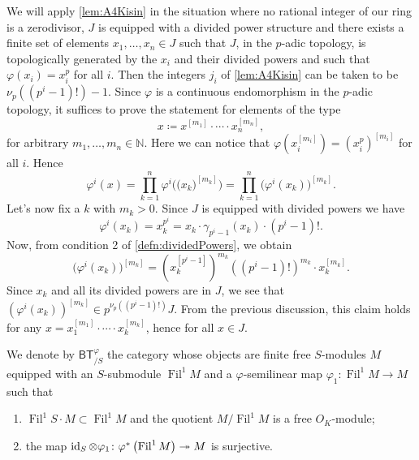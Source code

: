 \begin{rem}[]\label{rem:j_iTheoremA6}
	We will apply \cref{lem:A4Kisin} in the situation where no 
	rational integer of our ring is a zerodivisor, $J$ is equipped
	with a divided power structure and there exists a finite set of 
	elements $x_1, \ldots, x_n \in J$ such that $J$, in the $p$-adic topology, 
	is topologically generated by the $x_i$ and their divided powers
	and such that $\varphi(x_i) = x_i^p$ for all $i$.
	Then the integers $j_i$ of \cref{lem:A4Kisin} can
	be taken to be $\nu_p \left( (p^i-1)! \right) - 1$.
	Since $\varphi$ is a continuous endomorphism in the $p$-adic topology,
	it suffices to prove the statement for elements of the type
	\begin{equation*}
	x \coloneqq x^{[m_1]} \cdot \cdots \cdot x_n^{[m_n]}
	,\end{equation*}
	for arbitrary $m_1, \ldots, m_n \in \mathbb{N}$.
	Here we can notice that $\varphi(x_i^{[m_i]}) = \left( x_i^p \right)^{[m_i]}$
	for all $i$.
	Hence
	\begin{equation*}
		\varphi^i (x) = 
		\prod_{k = 1}^n \varphi^i \Big(\big( x_k \big)^{[m_k]}\Big) =
		\prod_{k = 1}^n 
		\big( \varphi^i(x_k) \big)^{[m_k]}
	.\end{equation*}
	Let's now fix a $k$ with $m_k > 0$.
	Since $J$ is equipped with divided powers we have
	\begin{equation*}
		\varphi^i(x_k) =
		x_k^{p^i} =
		x_k \cdot \gamma_{p^i-1}(x_k) \cdot (p^i-1)!
	.\end{equation*}
	Now, from condition 2 of \cref{defn:dividedPowers}, we obtain
	\begin{equation*}
		\big( \varphi^i(x_k) \big)^{[m_k]} =
		\left( x_k^{[p^i-1]} \right)^{m_k}
		(\left( p^i - 1 \right)!)^{m_k} \cdot x_k^{[m_k]}
	.\end{equation*}
	Since $x_k$ and all its divided powers are in $J$,
	we see that $(\varphi^i(x_k))^{[m_k]} \in p^{\nu_p((p^i-1)!)}J$.
	From the  previous discussion, this claim holds for any 
	$x = x_1^{[m_1]} \cdot \cdots \cdot x_k^{[m_k]}$, hence for all $x \in J$.
\end{rem}


\begin{defn}[]
	We denote by $\mathsf{BT}^{\varphi}_{/S}$ the category
	whose objects are finite free $S$-modules $M$
	equipped with an $S$-submodule $\operatorname{Fil}^1 M$
	and a $\varphi$-semilinear map $\varphi_1\colon  \operatorname{Fil}^1 M \to M$
	such that
\begin{enumerate}
	\item $\operatorname{Fil}^1 S \cdot M \subset \operatorname{Fil}^1 M$
		and the quotient $M/\operatorname{Fil}^1 M$ is a free $O_{ K }$-module;
	\item the map $\operatorname{id}_{ S } \otimes \varphi_1\colon 
		\varphi^* \left( \operatorname{Fil}^1 M \right) \twoheadrightarrow M$
		is surjective.
\end{enumerate}
\end{defn}


